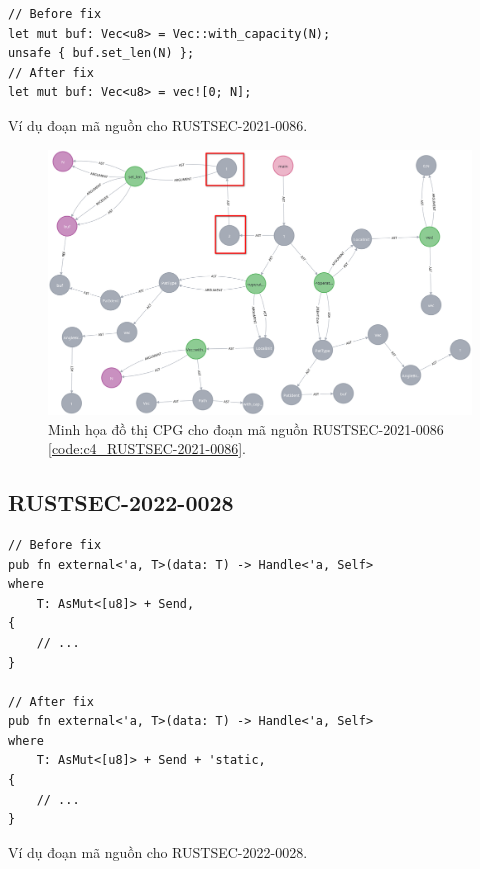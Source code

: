 \begin{listing}[H]
\begin{verbatim}
// Before fix
let mut buf: Vec<u8> = Vec::with_capacity(N);
unsafe { buf.set_len(N) };
// After fix
let mut buf: Vec<u8> = vec![0; N];
\end{verbatim}
\caption{Ví dụ đoạn mã nguồn cho RUSTSEC-2021-0086.}
\label{code:c4_RUSTSEC-2021-0086}
\end{listing}

\begin{figure}[H]
    \includegraphics[width=1\columnwidth]{figures/c4.highlight/c4_RUSTSEC-2021-0086_low.png}
    \centering
    \caption{Minh họa đồ thị CPG cho đoạn mã nguồn RUSTSEC-2021-0086 \ref{code:c4_RUSTSEC-2021-0086}.}
    \label{img:c4_RUSTSEC-2021-0086}
\end{figure}

\subsection{RUSTSEC-2022-0028}

\begin{listing}[H]
\begin{verbatim}
// Before fix
pub fn external<'a, T>(data: T) -> Handle<'a, Self>
where
    T: AsMut<[u8]> + Send,
{
    // ...
}

// After fix
pub fn external<'a, T>(data: T) -> Handle<'a, Self>
where
    T: AsMut<[u8]> + Send + 'static,
{
    // ...
}
\end{verbatim}
\caption{Ví dụ đoạn mã nguồn cho RUSTSEC-2022-0028.}
\label{code:c4_RUSTSEC-2022-0028}
\end{listing}

